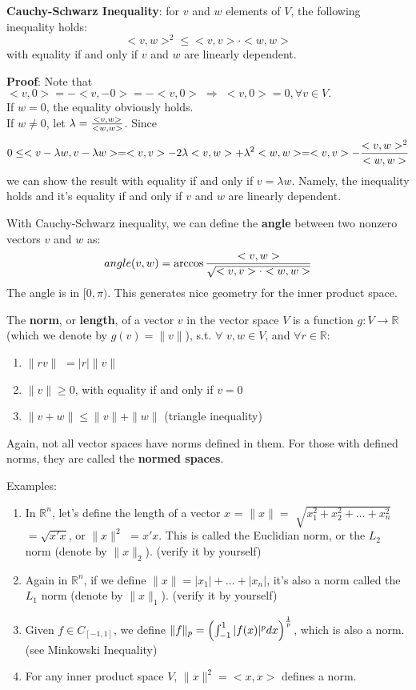 \documentclass[12pt,oneside]{article}
\begin{document}
\textbf{Cauchy-Schwarz Inequality}: for $v$ and $w$ elements of $V$, the following inequality holds:
\[
<v,w>^2\leq <v,v>\cdot<w,w>
\]
with equality if and only if $v$ and $w$ are linearly dependent.

\textbf{Proof}: Note that $<v,0> = -<v,-0>= -<v,0> \;\Rightarrow\; <v,0>=0,\forall v\in V.$\\
If $w=0$, the equality obviously holds.\\
If $w\neq0$, let $\lambda={<v,w>\over <w,w>}$. Since
\[
0\leq <v-\lambda w,v-\lambda w>=<v,v>-2\lambda<v,w>+\lambda^2<w,w>=<v,v>-{<v,w>^2\over <w,w>}
\]
we can show the result with equality if and only if $v=\lambda w$.
Namely, the inequality holds and it's equality if and only if $v$ and $w$ are linearly dependent.

With Cauchy-Schwarz inequality, we can define the \textbf{angle} between two nonzero vectors $v$ and $w$ as:
\[
angle(v,w)=\arccos{<v,w>\over\sqrt{<v,v>\cdot<w,w>}}
\]
The angle is in $[0,\pi)$.
This generates nice geometry for the inner product space.


The \textbf{norm}, or \textbf{length}, of a vector $v$ in the vector space $V$ is
 a function $g: V \rightarrow \mathbb{R}$ (which we denote by $g(v)= \|v\|$),
s.t. $\forall$ $v, w\in V$, and $\forall r \in \mathbb{R}$:
\begin{enumerate}
\item $\|rv\|$ $= |r|\|v\|$ 
\item $\|v\| \geq 0$, with equality if and only if $v=0$
\item $\|v+ w\| \leq \|v\|+\|w\|$ (triangle inequality)
\end{enumerate}

Again, not all vector spaces have norms defined in them. 
For those with defined norms, they are called the \textbf{normed spaces}.

\noindent Examples:
\begin{enumerate}
\item In ${\mathbb{R}}^n$, let's define the length of a
vector $x$ = $\|x\| = $ $\sqrt{x_{1}^2 + x_{2}^2 + \ldots + x_{n}^2}$ $=
\sqrt{x'x}$, or $\|x\|^2$ $= x'x$. This is called the Euclidian norm, or the $L_2$ norm (denote by $\|x\|_2$). (verify it by yourself)
\item Again in ${\mathbb{R}}^n$, if we define $\|x\|=|x_1|+\ldots+|x_n|$, it's also a norm called the $L_1$ norm (denote by $\|x\|_1$). (verify it by yourself)
\item Given $f\in C_{[-1, 1]}$, we define $\|f\|_p=\left(\int_{-1}^1 |f(x)|^p dx \right)^{1\over p}$, which is also a norm. (see Minkowski Inequality)
\item For any inner product space \( V\), \(\|x\|^2= <x,x> \) defines a norm.
\end{enumerate}
\end{document}
